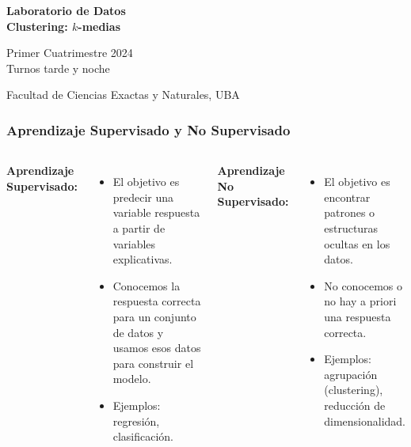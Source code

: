 \documentclass[aspectratio=169,12pt]{beamer}
\begin{document}

\begin{frame}

 \begin{center}

\Large\textbf{Laboratorio de Datos} \\
\large\textbf{Clustering: $k$-medias}




\vspace{1cm}
Primer Cuatrimestre 2024 \\ Turnos tarde y noche

\vspace{1cm}


 {\small Facultad de Ciencias Exactas y Naturales, UBA}
 \end{center}


\end{frame}


\begin{frame}
\frametitle{Aprendizaje Supervisado y No Supervisado}
\begin{columns}
    \textbf{Aprendizaje Supervisado:}
    \begin{itemize}
        \item El objetivo es predecir una variable respuesta a partir de variables explicativas.
        \item Conocemos la respuesta correcta para un conjunto de datos y usamos esos datos para construir el modelo.
        \item Ejemplos: regresión, clasificación.
    \end{itemize}

    \textbf{Aprendizaje No Supervisado:}
    \begin{itemize}
        \item El objetivo es encontrar patrones o estructuras ocultas en los datos.
        \item No conocemos o no hay a priori una respuesta correcta.
        \item Ejemplos: agrupación (clustering), reducción de dimensionalidad.
    \end{itemize}
\end{columns}
\end{frame}
\end{document}
